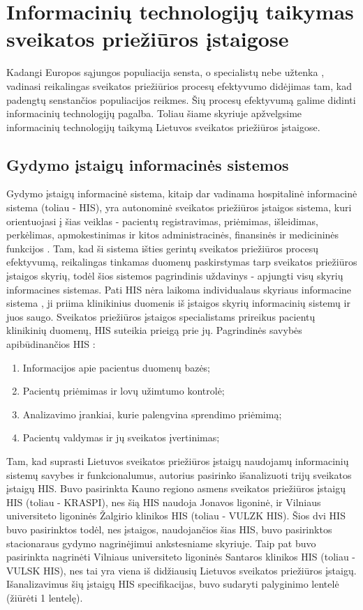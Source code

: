 \section{Informacinių technologijų taikymas sveikatos priežiūros įstaigose}
 Kadangi Europos sąjungos populiacija sensta, o specialistų nebe užtenka \cite{Organization2012} \cite{Eurostat}, vadinasi reikalingas sveikatos priežiūrios procesų efektyvumo didėjimas tam, kad padengtų senstančios populiacijos reikmes. Šių procesų efektyvumą galime didinti informacinių technologijų pagalba. Toliau šiame skyriuje apžvelgsime informacinių technologijų taikymą Lietuvos sveikatos priežiūros įstaigose.

\subsection{Gydymo įstaigų informacinės sistemos}
Gydymo įstaigų informacinė sistema, kitaip dar vadinama hospitalinė informacinė sistema (toliau - HIS), yra autonominė sveikatos priežiūros įstaigos sistema, kuri orientuojasi į šias veiklas - pacientų registravimas, priėmimas, išleidimas, perkėlimas, apmokestinimas ir kitos administracinės, finansinės ir medicininės funkcijos \cite{Sabooniha2012}. Tam, kad ši sistema išties gerintų sveikatos priežiūros procesų efektyvumą, reikalingas tinkamas duomenų paskirstymas tarp sveikatos priežiūros įstaigos skyrių, todėl šios sistemos pagrindinis uždavinys - apjungti visų skyrių informacines sistemas. Pati HIS nėra laikoma individualaus skyriaus informacine sistema \cite{JuliusGriskevicius}, ji priima klinikinius duomenis iš įstaigos skyrių informacinių sistemų ir juos saugo. Sveikatos priežiūros įstaigos specialistams prireikus pacientų klinikinių duomenų, HIS suteikia prieigą prie jų. Pagrindinės savybės apibūdinančios HIS \cite{JuliusGriskevicius}: 
\begin{enumerate}
    \item Informacijos apie pacientus duomenų bazės;
    \item Pacientų priėmimas ir lovų užimtumo kontrolė;
    \item Analizavimo įrankiai, kurie palengvina sprendimo priėmimą;
    \item Pacientų valdymas ir jų sveikatos įvertinimas;
\end{enumerate}


Tam, kad suprasti Lietuvos sveikatos priežiūros įstaigų naudojamų informacinių sistemų savybes ir funkcionalumus, autorius pasirinko išanalizuoti trijų sveikatos įstaigų HIS. Buvo pasirinkta Kauno regiono asmens sveikatos priežiūros įstaigų HIS (toliau - KRASPI), nes šią HIS naudoja Jonavos ligoninė, ir Vilniaus universiteto ligoninės Žalgirio klinikos HIS (toliau - VULZK HIS). Šios dvi HIS buvo pasirinktos todėl, nes įstaigos, naudojančios šias HIS, buvo pasirinktos stacionaraus gydymo nagrinėjimui ankstesniame skyriuje. Taip pat buvo pasirinkta nagrinėti Vilniaus universiteto ligoninės Santaros klinikos HIS (toliau - VULSK HIS), nes tai yra viena iš didžiausių Lietuvos sveikatos priežiūros įstaigų. Išanalizavimus šių įstaigų HIS specifikacijas, buvo sudaryti palyginimo lentelė (žiūrėti 1 lentelę). 

